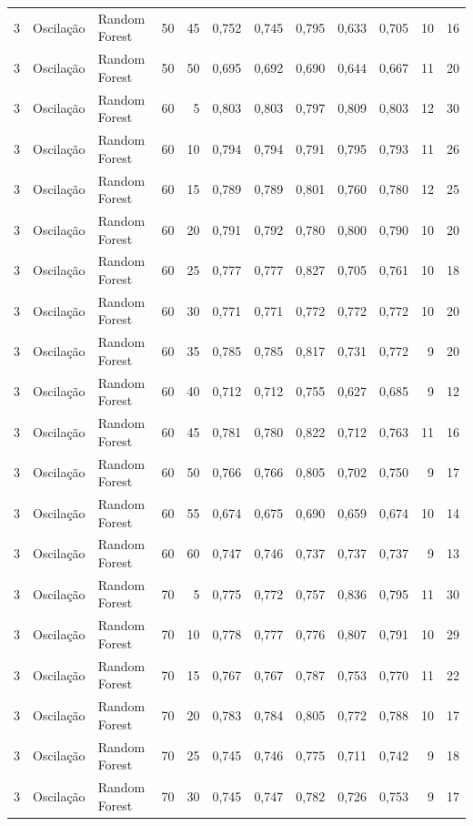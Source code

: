 \begin{longtable}{@{}rllrrrrrrrrr@{}}
3 & Oscilação & Random Forest & 50 & 45 & 0,752 & 0,745 & 0,795 & 0,633 & 0,705 & 10 & 16 \\
3 & Oscilação & Random Forest & 50 & 50 & 0,695 & 0,692 & 0,690 & 0,644 & 0,667 & 11 & 20 \\
3 & Oscilação & Random Forest & 60 & 5 & 0,803 & 0,803 & 0,797 & 0,809 & 0,803 & 12 & 30 \\
3 & Oscilação & Random Forest & 60 & 10 & 0,794 & 0,794 & 0,791 & 0,795 & 0,793 & 11 & 26 \\
3 & Oscilação & Random Forest & 60 & 15 & 0,789 & 0,789 & 0,801 & 0,760 & 0,780 & 12 & 25 \\
3 & Oscilação & Random Forest & 60 & 20 & 0,791 & 0,792 & 0,780 & 0,800 & 0,790 & 10 & 20 \\
3 & Oscilação & Random Forest & 60 & 25 & 0,777 & 0,777 & 0,827 & 0,705 & 0,761 & 10 & 18 \\
3 & Oscilação & Random Forest & 60 & 30 & 0,771 & 0,771 & 0,772 & 0,772 & 0,772 & 10 & 20 \\
3 & Oscilação & Random Forest & 60 & 35 & 0,785 & 0,785 & 0,817 & 0,731 & 0,772 & 9 & 20 \\
3 & Oscilação & Random Forest & 60 & 40 & 0,712 & 0,712 & 0,755 & 0,627 & 0,685 & 9 & 12 \\
3 & Oscilação & Random Forest & 60 & 45 & 0,781 & 0,780 & 0,822 & 0,712 & 0,763 & 11 & 16 \\
3 & Oscilação & Random Forest & 60 & 50 & 0,766 & 0,766 & 0,805 & 0,702 & 0,750 & 9 & 17 \\
3 & Oscilação & Random Forest & 60 & 55 & 0,674 & 0,675 & 0,690 & 0,659 & 0,674 & 10 & 14 \\
3 & Oscilação & Random Forest & 60 & 60 & 0,747 & 0,746 & 0,737 & 0,737 & 0,737 & 9 & 13 \\
3 & Oscilação & Random Forest & 70 & 5 & 0,775 & 0,772 & 0,757 & 0,836 & 0,795 & 11 & 30 \\
3 & Oscilação & Random Forest & 70 & 10 & 0,778 & 0,777 & 0,776 & 0,807 & 0,791 & 10 & 29 \\
3 & Oscilação & Random Forest & 70 & 15 & 0,767 & 0,767 & 0,787 & 0,753 & 0,770 & 11 & 22 \\
3 & Oscilação & Random Forest & 70 & 20 & 0,783 & 0,784 & 0,805 & 0,772 & 0,788 & 10 & 17 \\
3 & Oscilação & Random Forest & 70 & 25 & 0,745 & 0,746 & 0,775 & 0,711 & 0,742 & 9 & 18 \\
3 & Oscilação & Random Forest & 70 & 30 & 0,745 & 0,747 & 0,782 & 0,726 & 0,753 & 9 & 17 \\

\end{longtable}
